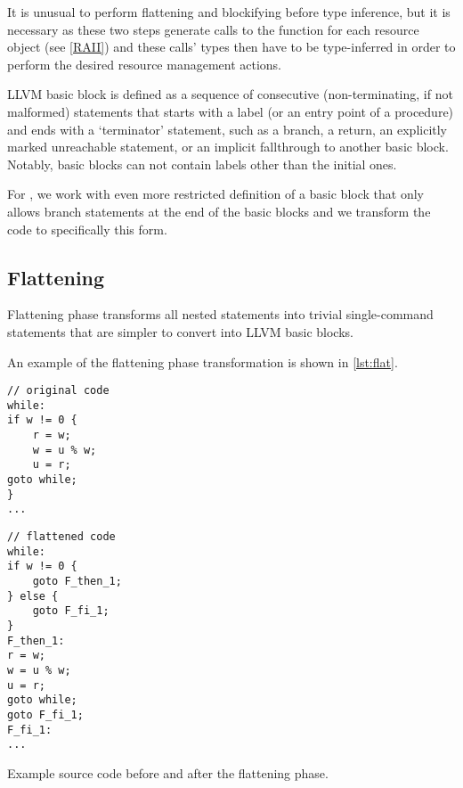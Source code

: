 \begin{remark}
    It is unusual to perform flattening and blockifying before type inference, but it is necessary as these two steps generate calls to the  function for each resource object (see \cref{RAII}) and these calls' types then have to be type-inferred in order to perform the desired resource management actions.
\end{remark}

LLVM basic block is defined as a sequence of consecutive (non-terminating, if not malformed) statements that starts with a label (or an entry point of a procedure) and ends with a `terminator' statement, such as a branch, a return, an explicitly marked unreachable statement, or an implicit fallthrough to another basic block. Notably, basic blocks can not contain labels other than the initial ones.

For \cmm, we work with even more restricted definition of a basic block that only allows branch statements at the end of the basic blocks and we transform the code to specifically this form.

\subsection{Flattening}

Flattening phase transforms all nested statements into trivial single-command statements that are simpler to convert into LLVM basic blocks.

An example of the flattening phase transformation is shown in \cref{lst:flat}.

\begin{listing}
\begin{center}
\begin{minipage}{0.5\linewidth}
\begin{lstlisting}
// original code
while:
if w != 0 {
    r = w;
    w = u % w;
    u = r;
goto while;
}
...\end{lstlisting}
\end{minipage}%
\begin{minipage}{0.5\linewidth}
\begin{lstlisting}
// flattened code
while:
if w != 0 {
    goto F_then_1;
} else {
    goto F_fi_1;
}
F_then_1:
r = w;
w = u % w;
u = r;
goto while;
goto F_fi_1;
F_fi_1:
...\end{lstlisting}
\end{minipage}
\end{center}
\caption{Example source code before and after the flattening phase.}
\label{lst:flat}
\end{listing}

